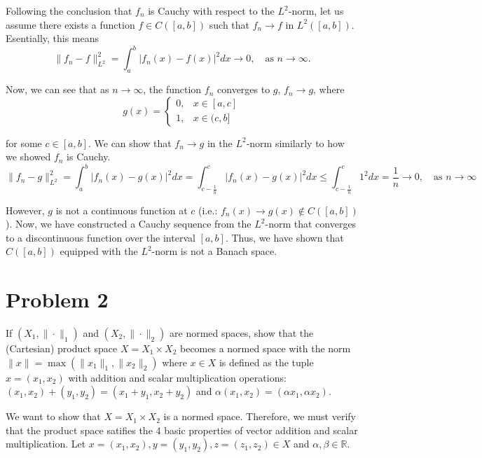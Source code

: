 \documentclass[12pt]{article}
\begin{document}
Following the conclusion that $f_n$ is Cauchy with respect to the $L^2$-norm, let us assume there exists a function
$f \in C([a,b])$ such that $f_n \to f$ in $L^2([a,b])$. Esentially, this means
\begin{equation*}
    \|f_n - f\|_{L^2}^{2} = \int_{a}^{b} |f_n(x) - f(x)|^2dx \to 0, \quad \text{as } n \to \infty.
\end{equation*}

Now, we can see that as $n\to \infty$, the function $f_n$ converges to $g$, $f_n \to g$, where
\[
    g(x) =
        \begin{cases}
            0, & x \in [a, c] \\
            1, & x \in (c, b]
        \end{cases}
\]

for some $c\in [a,b]$. We can show that $f_n \to g$ in the $L^2$-norm similarly to how we showed $f_n$ is Cauchy.
\[
    \|f_n - g\|_{L^2}^2 = \int_{a}^{b} |f_n(x) - g(x)|^2dx = \int_{c- \frac{1}{n}}^{c} |f_n(x) - g(x)|^2dx \leq \int_{c- \frac{1}{n}}^{c} 1^2dx = \frac{1}{n} \to 0, \quad \text{as } n \to \infty
\]

However, $g$ is not a continuous function at $c$ (i.e.: $f_n(x) \to g(x) \notin C([a,b])$).
Now, we have constructed a Cauchy sequence from the $L^2$-norm that converges to a discontinuous 
function over the interval $[a,b]$. Thus, we have shown that $C([a,b])$ equipped with the $L^2$-norm is not a Banach space.  

\newpage

\section{Problem 2}
\begin{mdframed}
    If $(X_1,\|\cdot\|_1)$ and $(X_2, \|\cdot\|_2)$ are normed spaces, show that the (Cartesian) product space $X = X_1 \times X_2$
    becomes a normed space with the norm $\|x\|=\max(\|x_1\|_1, \|x_2\|_2)$ where $x\in X$ is defined as the tuple $x=(x_1, x_2)$
    with addition and scalar multiplication operations: 
        $(x_1,x_2) + (y_1,y_2) = (x_1 + y_1, x_2 + y_2)$ and 
        $\alpha(x_1,x_2) = (\alpha x_1, \alpha x_2)$.
\end{mdframed}

We want to show that $X=X_1 \times X_2$ is a normed space. Therefore, we must verify that the product space satifies the 
4 basic properties of vector addition and scalar multiplication. Let $x=(x_1,x_2), y=(y_1,y_2), z=(z_1,z_2) \in X$ and 
$\alpha,\beta \in \mathbb{R}$.
\end{document}
